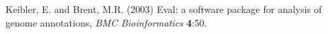 \documentclass{bioinfo}
\begin{document}
\begin{thebibliography}{}
 Keibler, E. and Brent, M.R. (2003) Eval: a software package for analysis of genome annotations, \textit{BMC Bioinformatics} \textbf{4}:50.



\end{thebibliography}
\end{document}
